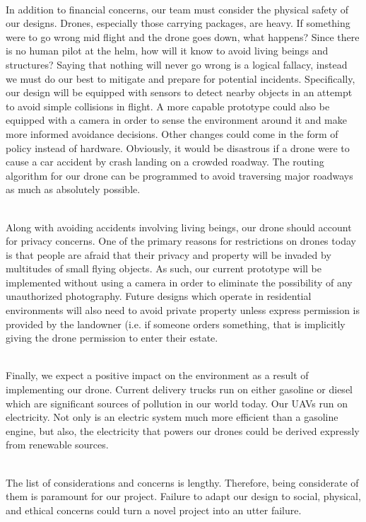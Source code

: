 \documentclass[12pt]{extarticle}
\begin{document}
\ \\
In addition to financial concerns, our team must consider the physical safety of our designs.  Drones, especially those carrying packages, are heavy.  If something were to go wrong mid flight and the drone goes down, what happens?  Since there is no human pilot at the helm, how will it know to avoid living beings and structures?  Saying that nothing will never go wrong is a logical fallacy, instead we must do our best to mitigate and prepare for potential incidents.  Specifically, our design will be equipped with sensors to detect nearby objects in an attempt to avoid simple collisions in flight.  A more capable prototype could also be equipped with a camera in order to sense the environment around it and make more informed avoidance decisions.  Other changes could come in the form of policy instead of hardware.  Obviously, it would be disastrous if a drone were to cause a car accident by crash landing on a crowded roadway.  The routing algorithm for our drone can be programmed to avoid traversing major roadways as much as absolutely possible.  

\ \\
Along with avoiding accidents involving living beings, our drone should account for privacy concerns.  One of the primary reasons for restrictions on drones today is that people are afraid that their privacy and property will be invaded by multitudes of small flying objects.  As such, our current prototype will be implemented without using a camera in order to eliminate the possibility of any unauthorized photography.  Future designs which operate in residential environments will also need to avoid private property unless express permission is provided by the landowner (i.e. if someone orders something, that is implicitly giving the drone permission to enter their estate.  

\ \\
Finally, we expect a positive impact on the environment as a result of implementing our drone.  Current delivery trucks run on either gasoline or diesel which are significant sources of pollution in our world today.  Our UAVs run on electricity.  Not only is an electric system much more efficient than a gasoline engine, but also, the electricity that powers our drones could be derived expressly from renewable sources.  

\ \\
The list of considerations and concerns is lengthy.  Therefore, being considerate of them is paramount for our project.  Failure to adapt our design to social, physical, and ethical concerns could turn a novel project into an utter failure. 
\end{document}
